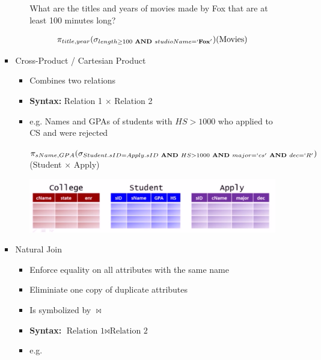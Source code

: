 \documentclass[12pt]{article}
\begin{document}
\begin{enumerate}
\begin{enumerate}[a)]
\begin{itemize}
\begin{itemize}
                What are the titles and years of movies made by Fox that
                are at least 100 minutes long?

                \begin{align*}
                    \pi_{title,year}(\sigma_{length \geq 100 \textbf{ AND } studioName=`\textbf{Fox}'})(\text{Movies})
                \end{align*}
            \end{itemize}

            \item Cross-Product / Cartesian Product
            \begin{itemize}
                \item Combines two relations
                \item \textbf{Syntax:} Relation 1 $\times$ Relation 2
                \item e.g. Names and GPAs of students with $HS > 1000$ who applied
                to CS and were rejected

                \bigskip

                $ \pi_{sName, GPA}(\sigma_{Student.sID = Apply.sID \textbf{ AND }
                HS > 1000 \textbf{ AND } major = `cs' \textbf{ AND } dec = `R'})$(Student $\times$ Apply)

                \bigskip

                \begin{center}
                \includegraphics[width=\linewidth]{images/worksheet_2_solution_4.png}
                \end{center}
            \end{itemize}

            \item Natural Join
            \begin{itemize}
                \item Enforce equality on all attributes with the same name
                \item Eliminiate one copy of duplicate attributes
                \item Is symbolized by $\bowtie$
                \item \textbf{Syntax:} $\text{Relation 1} \bowtie \text{Relation 2}$
                \item e.g.


\end{itemize}
\end{itemize}
\end{enumerate}
\end{enumerate}
\end{document}
